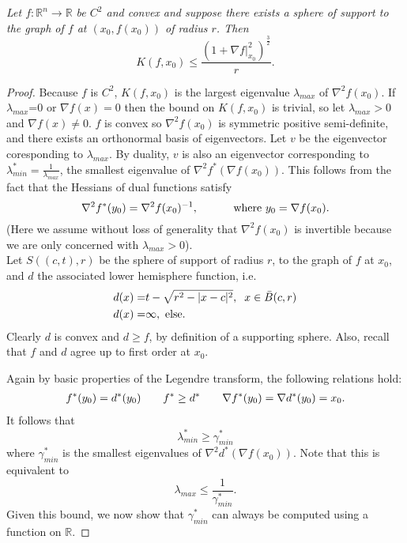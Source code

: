 \documentclass[10pt]{article}
\newenvironment{proposition}[2][Proposition]{\begin{trivlist}
\item[\hskip \labelsep {\bfseries #1}\hskip \labelsep {\bfseries #2.}]}{\end{trivlist}}
\begin{document}
\begin{proposition} {3.8}
\textit{Let $f:\mathbb{R}^n\rightarrow \mathbb{R}$ be $C^2$ and convex and suppose there exists a sphere of support to the graph of $f$ at $(x_0,f(x_0))$ of radius $r$. Then} $$K(f,x_0) \leq \dfrac{(1+\nabla f|_{x_0}^2)^\frac{3}{2}}{r}.$$
\end{proposition}
\begin{proof}
Because $f$ is $C^2$, $K(f,x_0)$ is the largest eigenvalue $\lambda_{max}$ of $\nabla^2 f(x_0)$. If $\lambda_{max}$=0 or $\nabla f(x)=0$ then the bound on $K(f,x_0)$ is trivial, so let $\lambda_{max}>0$ and $\nabla f(x)\neq 0$. $f$ is convex so $\nabla^2 f(x_0)$ is symmetric positive semi-definite, and there exists an orthonormal basis of eigenvectors. Let $v$ be the eigenvector coresponding to $\lambda_{max}$. By duality, $v$ is also an eigenvector corresponding to $\lambda^*_{min}= \frac{1}{\lambda_{max}}$, the smallest eigenvalue of $\nabla^2 f^*(\nabla f(x_0))$. This follows from the fact that the Hessians of dual functions satisfy
$$
\nabla^2 f^*(y_0) = \nabla^2 f(x_0)^{-1}, \hspace{10mm} \text{ where }y_0 = \nabla f(x_0).
$$ (Here we assume without loss of generality that $\nabla^2 f(x_0)$ is invertible because we are only concerned with $\lambda_{max}>0$).\\
Let $S((c,t),r)$ be the sphere of support of radius $r$, to the graph of $f$ at $x_0$, and $d$ the associated lower hemisphere function, i.e.
\begin{align*}
d(x) = & t - \sqrt{r^2 -|x-c|^2},\hspace{2mm} x\in \bar{B}(c,r)\\
d(x) =  &\infty, \text{ else}.
\end{align*}
Clearly $d$ is convex and $d \geq f$, by definition of a supporting sphere. Also, recall that $f$ and $d$ agree up to first order at $x_0$. 

Again by basic properties of the Legendre transform, the following relations hold:
\begin{align*}
f^*(y_0)=d^*(y_0) \hspace{7mm} f^* \geq d^* \hspace{7mm} \nabla f^*(y_0)= \nabla d^*(y_0)= x_0.
\end{align*}
It follows that  $$\lambda^*_{min} \geq \gamma^*_{min}$$ where $\gamma^*_{min}$ is the smallest eigenvalues of $\nabla ^2 d^*(\nabla f(x_0))$. Note that this is equivalent to 
$$\lambda_{max}\leq \frac{1}{\gamma^*_{min}}.$$
Given this bound, we now show that $\gamma^*_{min}$ can always be computed using a function on $\mathbb{R}$.


\end{proof}
\end{document}
